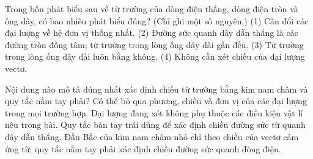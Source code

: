 \begin{ex}
Trong bốn phát biểu sau về từ trường của dòng điện thẳng, dòng điện tròn và ống dây, có bao nhiêu phát biểu đúng? (Chỉ ghi một số nguyên.) (1) Cần đổi các đại lượng về hệ đơn vị thống nhất. (2) Đường sức quanh dây dẫn thẳng là các đường tròn đồng tâm; từ trường trong lòng ống dây dài gần đều. (3) Từ trường trong lòng ống dây dài luôn bằng không. (4) Không cần xét chiều của đại lượng vectơ.
\end{ex}

\begin{ex}
Nội dung nào mô tả đúng nhất xác định chiều từ trường bằng kim nam châm và quy tắc nắm tay phải?
\choice
{Có thể bỏ qua phương, chiều và đơn vị của các đại lượng trong mọi trường hợp.}
{Đại lượng đang xét không phụ thuộc các điều kiện vật lí nêu trong bài.}
{Quy tắc bàn tay trái dùng để xác định chiều đường sức từ quanh dây dẫn thẳng.}
{\True Đầu Bắc của kim nam châm nhỏ chỉ theo chiều của vectơ cảm ứng từ; quy tắc nắm tay phải xác định chiều đường sức quanh dòng điện.}
\end{ex}


